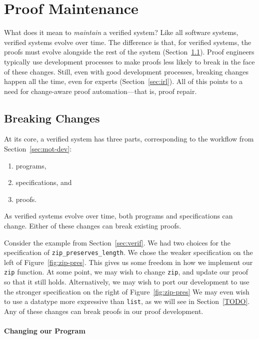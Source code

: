\section{Proof Maintenance}
\label{sec:mot-mai}

What does it mean to \textit{maintain} a verified system?
Like all software systems, verified systems evolve over time.
The difference is that, for verified systems, the proofs must evolve alongside the rest of the system (Section~\ref{sec:changes}).
Proof engineers typically use development processes to make proofs less likely to break in the face of these changes.
Still, even with good development processes, breaking changes happen all the time, even for experts (Section~\ref{sec:irl}).
All of this points to a need for change-aware proof automation---that is, proof repair.

\subsection{Breaking Changes}
\label{sec:changes}

At its core, a verified system has three parts, corresponding to the workflow from Section~\ref{sec:mot-dev}:

\begin{enumerate}
\item programs,
\item specifications, and
\item proofs.
\end{enumerate}
As verified systems evolve over time, both programs and specifications can change.
Either of these changes can break existing proofs.

Consider the example from Section~\ref{sec:verif}.
We had two choices for the specification of \lstinline{zip_preserves_length}.
We chose the weaker specification on the left of Figure~\ref{fig:zip-pres}.
This gives us some freedom in how we implement our \lstinline{zip} function.
At some point, we may wish to change \lstinline{zip}, and update our proof so that it still holds.
Alternatively, we may wish to port our development to use the stronger specification on the right of Figure~\ref{fig:zip-pres}
We may even wish to use a datatype more expressive than \lstinline{list}, as we will see in Section~\ref{TODO}. %
Any of these changes can break proofs in our proof development.

\paragraph{Changing our Program}

